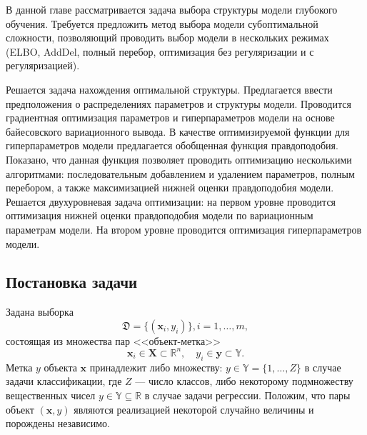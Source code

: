 В данной главе рассматривается задача выбора структуры модели глубокого обучения.  Требуется предложить метод выбора модели субоптимальной сложности, позволяющий проводить выбор модели в нескольких режимах (ELBO, AddDel, полный перебор, оптимизация без регуляризации и с регуляризацией).

Решается задача нахождения оптимальной структуры. Предлагается ввести предположения о распределениях параметров и структуры модели. 
Проводится градиентная оптимизация параметров и гиперпараметров модели на основе байесовского вариационного вывода.  В качестве оптимизируемой функции для гиперпараметров модели предлагается обобщенная функция правдоподобия. Показано, что данная функция позволяет проводить оптимизацию  несколькими алгоритмами: последовательным добавлением и удалением параметров, полным перебором, а также максимизацией нижней оценки правдоподобия модели. Решается двухуровневая задача оптимизации: на первом уровне проводится оптимизация нижней оценки правдоподобия модели по вариационным параметрам модели. На втором уровне проводится оптимизация гиперпараметров модели.



\subsection{Постановка задачи}
Задана выборка \begin{equation}\label{eq:dataset}\mathfrak{D} = \{(\mathbf{x}_i,y_i)\}, i = 1,\dots,m,\end{equation} состоящая из множества пар <<объект-метка>> $$\mathbf{x}_i \in \mathbf{X} \subset \mathbb{R}^n, \quad {y}_i \in \mathbf{y} \subset \mathbb{Y}.$$ Метка ${y}$  объекта $\mathbf{x}$ принадлежит либо множеству: ${y} \in \mathbb{Y} = \{1, \dots, Z\}$ в случае задачи классификации, где $Z$ --- число классов, либо некоторому подмножеству вещественных чисел ${y} \in \mathbb{Y}  \subseteq \mathbb{R}$ в случае задачи регрессии. Положим, что пары объект $(\mathbf{x}, y)$ являются реализацией некоторой случайно величины и порождены независимо.

